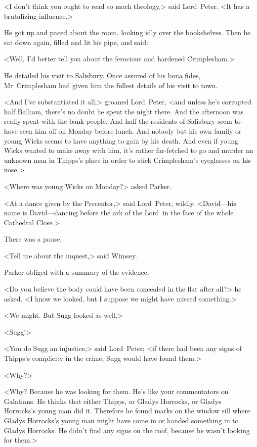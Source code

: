 <I don't think you ought to read so much theology,> said Lord~Peter. <It has a brutalizing influence.>

He got up and paced about the room, looking idly over the bookshelves. Then he sat down again, filled and lit his pipe, and said:

<Well, I'd better tell you about the ferocious and hardened Crimplesham.>

He detailed his visit to Salisbury. Once assured of his bona fides, Mr~Crimplesham had given him the fullest details of his visit to town.

<And I've substantiated it all,> groaned Lord~Peter, <and unless he's corrupted half Balham, there's no doubt he spent the night there. And the afternoon was really spent with the bank people. And half the residents of Salisbury seem to have seen him off on Monday before lunch. And nobody but his own family or young Wicks seems to have anything to gain by his death. And even if young Wicks wanted to make away with him, it's rather far-fetched to go and murder an unknown man in Thipps's place in order to stick Crimplesham's eyeglasses on his nose.>

<Where was young Wicks on Monday?> asked Parker.

<At a dance given by the Precentor,> said Lord~Peter, wildly. <David—his name is David—dancing before the ark of the Lord~in the face of the whole Cathedral Close.>

There was a pause.

<Tell me about the inquest,> said Wimsey.

Parker obliged with a summary of the evidence.

<Do you believe the body could have been concealed in the flat after all?> he asked. <I know we looked, but I suppose we might have missed something.>

<We might. But Sugg looked as well.>

<Sugg!>

<You do Sugg an injustice,> said Lord~Peter; <if there had been any signs of Thipps's complicity in the crime, Sugg would have found them.>

<Why?>

<Why? Because he was looking for them. He's like your commentators on Galatians. He thinks that either Thipps, or Gladys Horrocks, or Gladys Horrocks's young man did it. Therefore he found marks on the window sill where Gladys Horrocks's young man might have come in or handed something in to Gladys Horrocks. He didn't find any signs on the roof, because he wasn't looking for them.>

